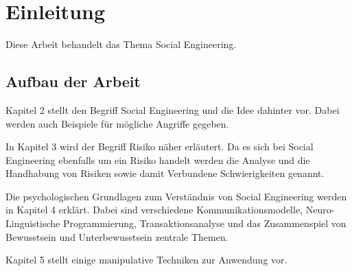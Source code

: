 \section{Einleitung}\label{2_kap1}
Diese Arbeit behandelt das Thema Social Engineering.

\subsection{Aufbau der Arbeit}
Kapitel 2 stellt den Begriff Social Engineering und die Idee dahinter vor.
Dabei werden auch Beispiele für mögliche Angriffe gegeben.

In Kapitel 3 wird der Begriff Risiko näher erläutert.
Da es sich bei Social Engineering ebenfalls um ein Risiko handelt werden die Analyse und die Handhabung
von Risiken sowie damit Verbundene Schwierigkeiten genannt.

Die psychologischen Grundlagen zum Verständnis von Social Engineering werden in Kapitel 4 erklärt.
Dabei sind verschiedene Kommunikationsmodelle, Neuro-Linguistische Programmierung, Transaktionsanalyse
und das Zusammenspiel von Bewusstsein und Unterbewusstsein zentrale Themen.

Kapitel 5 stellt einige manipulative Techniken zur Anwendung vor.